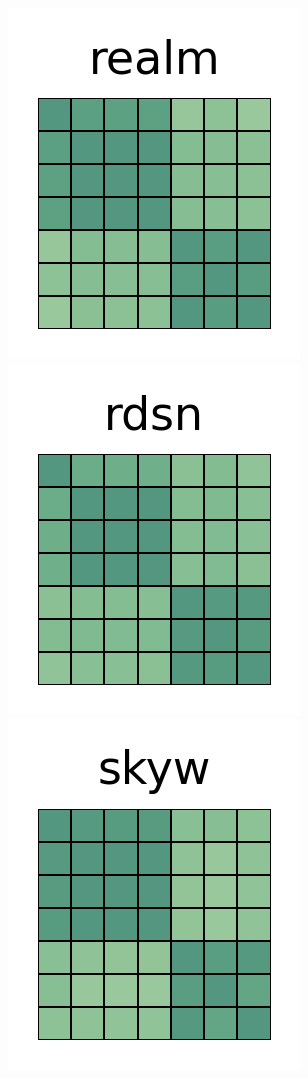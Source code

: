 \documentclass[10pt,conference]{IEEEtran}
\begin{document}
\begin{figure}[htb!]
 \includegraphics[width=\heatmapWidth, keepaspectratio]{correlations-classic/realm-java-grids.png}
 \includegraphics[width=\heatmapWidth, keepaspectratio]{correlations-classic/redisson-grids.png} \\
 \includegraphics[width=\heatmapWidth, keepaspectratio]{correlations-classic/skywalking-grids.png}

\end{figure}
\end{document}
